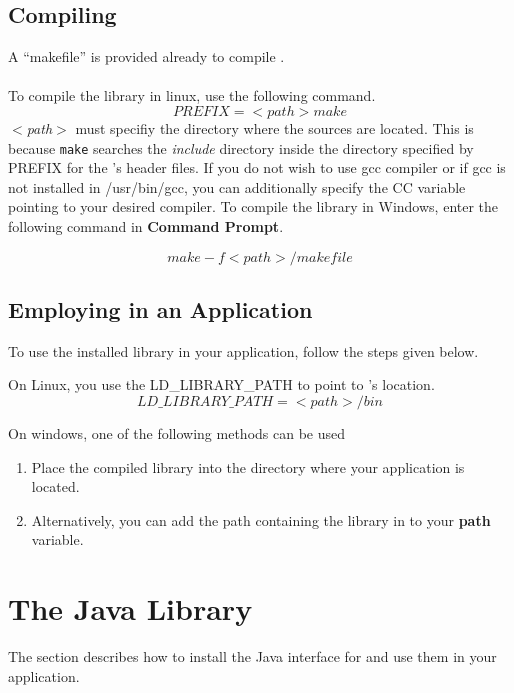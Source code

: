 \subsection*{Compiling \libalf}
A ``makefile'' is provided already to compile \libalf.
\paragraph{}
To compile the library in linux, use the following command.
\[
  PREFIX = <path> make
\]
\emph{$<$path$>$} must specifiy the directory where the \libalf sources are located. This is because \texttt{make} searches the \emph{include} directory inside the directory specified by PREFIX for the \libalf's header files. If you do not wish to use gcc compiler or if gcc is not installed in /usr/bin/gcc, you can additionally specify the CC variable pointing to your desired \cpp compiler. \vskip 1pt
\reversemarginpar
{} To compile the library in Windows, enter the following command in \textbf{Command Prompt}.

\[
 make -f <path>/makefile
\]
\subsection*{Employing \libalf in an Application}
To use the installed library in your application, follow the steps given below. \vskip 1pt

On Linux, you use the LD\_LIBRARY\_PATH to point to \libalf's location.
\[
  LD\_LIBRARY\_PATH = <path>/bin
\]

On windows, one of the following methods can be used 
\begin{enumerate}
 \item Place the compiled library into the directory where your application is located.
 \item Alternatively, you can add the path containing the \libalf library in to your \textbf{path} variable.
\end{enumerate}

\section{The \jalf Java Library}
The section describes how to install the Java interface for \libalf and use them in your application.
